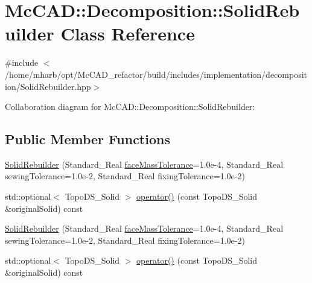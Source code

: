 \hypertarget{classMcCAD_1_1Decomposition_1_1SolidRebuilder}{}\section{Mc\+C\+AD\+:\+:Decomposition\+:\+:Solid\+Rebuilder Class Reference}
\label{classMcCAD_1_1Decomposition_1_1SolidRebuilder}


{\ttfamily \#include $<$/home/mharb/opt/\+Mc\+C\+A\+D\+\_\+refactor/build/includes/implementation/decomposition/\+Solid\+Rebuilder.\+hpp$>$}



Collaboration diagram for Mc\+C\+AD\+:\+:Decomposition\+:\+:Solid\+Rebuilder\+:
\subsection*{Public Member Functions}
\begin{DoxyCompactItemize}
\item 
\hyperlink{classMcCAD_1_1Decomposition_1_1SolidRebuilder_a44d8d2538e3297c5c8b843a6e5aa130d}{Solid\+Rebuilder} (Standard\+\_\+\+Real \hyperlink{classMcCAD_1_1Decomposition_1_1SolidRebuilder_a7f2b562442c029dfec153a3f16df5b79}{face\+Mass\+Tolerance}=1.\+0e-\/4, Standard\+\_\+\+Real sewing\+Tolerance=1.\+0e-\/2, Standard\+\_\+\+Real fixing\+Tolerance=1.\+0e-\/2)
\item 
std\+::optional$<$ Topo\+D\+S\+\_\+\+Solid $>$ \hyperlink{classMcCAD_1_1Decomposition_1_1SolidRebuilder_acd4a860cd5e7e2fa349ae891da81556a}{operator()} (const Topo\+D\+S\+\_\+\+Solid \&original\+Solid) const
\item 
\hyperlink{classMcCAD_1_1Decomposition_1_1SolidRebuilder_a44d8d2538e3297c5c8b843a6e5aa130d}{Solid\+Rebuilder} (Standard\+\_\+\+Real \hyperlink{classMcCAD_1_1Decomposition_1_1SolidRebuilder_a7f2b562442c029dfec153a3f16df5b79}{face\+Mass\+Tolerance}=1.\+0e-\/4, Standard\+\_\+\+Real sewing\+Tolerance=1.\+0e-\/2, Standard\+\_\+\+Real fixing\+Tolerance=1.\+0e-\/2)
\item 
std\+::optional$<$ Topo\+D\+S\+\_\+\+Solid $>$ \hyperlink{classMcCAD_1_1Decomposition_1_1SolidRebuilder_acf06e8ef7a0849111550f4ca05ff44da}{operator()} (const Topo\+D\+S\+\_\+\+Solid \&original\+Solid) const
\end{DoxyCompactItemize}
